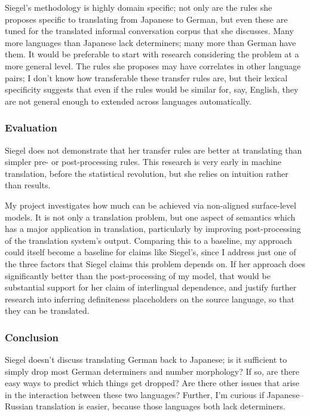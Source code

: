 \documentclass[11pt]{article}
\begin{document}

Siegel's methodology is highly domain specific; not only are the rules she proposes specific to translating from Japanese to German, but even these are tuned for the translated informal conversation corpus that she discusses.
Many more languages than Japanese lack determiners; many more than German have them. It would be preferable to start with research considering the problem at a more general level. The rules she proposes may have correlates in other language pairs; I don't know how transferable these transfer rules are, but their lexical specificity suggests that even if the rules would be similar for, say, English, they are not general enough to extended across languages automatically.

\subsubsection*{Evaluation}

Siegel does not demonstrate that her transfer rules are better at translating than simpler pre- or post-processing rules. This research is very early in machine translation, before the statistical revolution, but she relies on intuition rather than results.

My project investigates how much can be achieved via non-aligned surface-level models. It is not only a translation problem, but one aspect of semantics which has a major application in translation, particularly by improving post-processing of the translation system's output. Comparing this to a baseline, my approach could itself become a baseline for claims like Siegel's, since I address just one of the three factors that Siegel claims this problem depends on. If her approach does significantly better than the post-processing of my model, that would be substantial support for her claim of interlingual dependence, and justify further research into inferring definiteness placeholders on the source language, so that they can be translated.


\subsubsection*{Conclusion}

Siegel doesn't discuss translating German back to Japanese; is it sufficient to simply drop most German determiners and number morphology? If so, are there easy ways to predict which things get dropped? Are there other issues that arise in the interaction between these two languages? Further, I'm curious if Japanese--Russian translation is easier, because those languages both lack determiners.
\end{document}
